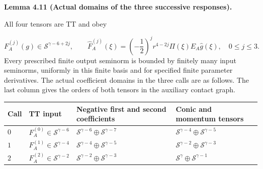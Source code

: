 \documentclass[
  english,
  11pt,
  reqno]{amsart}
\makeatletter
\newcounter{none} %
\newcommand{\pandocstatementheading}[1]{%
  \par\addpenalty{\@beginparpenalty}%
  \addvspace{.5\baselineskip plus .2\baselineskip minus .2\baselineskip}%
  {\normalfont\bfseries #1\par}%
  \nobreak\@afterindenttrue\@afterheading
}
\makeatother
\begin{document}
\pandocstatementheading{\leavevmode{}\label{lem:online-negative-response-intermediate-orders}Lemma 4.11 (Actual domains of the three successive responses).}

All four tensors are TT and obey

\label{eq:online-negative-response-intermediate-orders}
\[
F_A^{(j)}(g)\in\mathscr S^{\gamma-6+2j},\qquad
\widehat F_A^{(j)}(\xi)
=\left(-\frac12\right)^j r^{4-2j}\Pi(\xi)E_A\widehat g(\xi),
\quad 0\le j\le3.
\] Every prescribed finite output seminorm is bounded by finitely many
input seminorms, uniformly in this finite basis and for specified finite
parameter derivatives. The actual coefficient domains in the three calls
are as follows. The last column gives the orders of both tensors in the
auxiliary contact graph.

{\def\LTcaptype{none} %
\begin{longtable}[]{@{}
  >{\raggedright\arraybackslash}p{}
  >{\raggedright\arraybackslash}p{}
  >{\raggedright\arraybackslash}p{}
  >{\raggedright\arraybackslash}p{}@{}}
\toprule\noalign{}
\begin{minipage}[b]{\linewidth}\raggedright
Call
\end{minipage} & \begin{minipage}[b]{\linewidth}\raggedright
TT input
\end{minipage} & \begin{minipage}[b]{\linewidth}\raggedright
Negative first and second coefficients
\end{minipage} & \begin{minipage}[b]{\linewidth}\raggedright
Conic and momentum tensors
\end{minipage} \\
\midrule\noalign{}
\endhead
\bottomrule\noalign{}
\endlastfoot
\(0\) & \(F_A^{(0)}\in\mathscr S^{\gamma-6}\) &
\(\mathscr S^{\gamma-6}\oplus\mathscr S^{\gamma-7}\) &
\(\mathscr S^{\gamma-4}\oplus\mathscr S^{\gamma-5}\) \\
\(1\) & \(F_A^{(1)}\in\mathscr S^{\gamma-4}\) &
\(\mathscr S^{\gamma-4}\oplus\mathscr S^{\gamma-5}\) &
\(\mathscr S^{\gamma-2}\oplus\mathscr S^{\gamma-3}\) \\
\(2\) & \(F_A^{(2)}\in\mathscr S^{\gamma-2}\) &
\(\mathscr S^{\gamma-2}\oplus\mathscr S^{\gamma-3}\) &
\(\mathscr S^{\gamma}\oplus\mathscr S^{\gamma-1}\) \\
\end{longtable}
}
\end{document}
